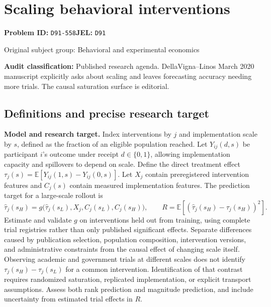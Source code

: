 \documentclass[11pt,a4paper]{article}
\begin{document}
\section*{Scaling behavioral interventions}
\textbf{Problem ID:} \texttt{D91-558}\quad \textbf{JEL:} \texttt{D91}\par
\label{problem:OP-0308}
{\sffamily\small\color{muted}Original subject group: Behavioral and experimental economics\par}
\label{definitions:problem:30007590}
\textbf{Audit classification:} Published research agenda. DellaVigna–Linos March 2020 manuscript explicitly asks about scaling and leaves forecasting accuracy needing more trials. The causal saturation surface is editorial.
\subsection*{Definitions and precise research target}
\textbf{Model and research target.} Index interventions by \(j\) and implementation scale by \(s\), defined as the fraction of an eligible population reached. Let \(Y_{ij}(d,s)\) be participant \(i\)'s outcome under receipt \(d\in\{0,1\}\), allowing implementation capacity and spillovers to depend on scale. Define the direct treatment effect \(\tau_j(s)=\mathbb E[Y_{ij}(1,s)-Y_{ij}(0,s)]\). Let \(X_j\) contain preregistered intervention features and \(C_j(s)\) contain measured implementation features. The prediction target for a large-scale rollout is
\[\widehat\tau_j(s_H)=g\bigl(\widehat\tau_j(s_L),X_j,C_j(s_L),C_j(s_H)\bigr),\qquad R=\mathbb E[(\widehat\tau_j(s_H)-\tau_j(s_H))^2].\]
Estimate and validate \(g\) on interventions held out from training, using complete trial registries rather than only published significant effects. Separate differences caused by publication selection, population composition, intervention versions, and administrative constraints from the causal effect of changing scale itself. Observing academic and government trials at different scales does not identify \(\tau_j(s_H)-\tau_j(s_L)\) for a common intervention. Identification of that contrast requires randomized saturation, replicated implementation, or explicit transport assumptions. Assess both rank prediction and magnitude prediction, and include uncertainty from estimated trial effects in \(R\).
\end{document}
